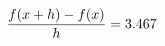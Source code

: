 \documentclass[preview]{standalone}
\begin{document}
\begin{align*}
\special{dvisvgm:raw <g id='unique000'>}\frac{f(x+h)-f(x)}{h} = 3.467\special{dvisvgm:raw </g>}
\end{align*}
\end{document}

